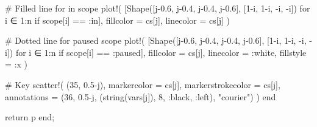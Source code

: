 \documentclass[
  letterpaper,
  DIV=11,
  numbers=noendperiod]{scrreprt}
\newenvironment{Shaded}{\begin{snugshade}}{\end{snugshade}}
\newcommand{\CommentTok}[1]{\textcolor[rgb]{0.37,0.37,0.37}{#1}}
\newcommand{\ControlFlowTok}[1]{\textcolor[rgb]{0.00,0.23,0.31}{#1}}
\newcommand{\FloatTok}[1]{\textcolor[rgb]{0.68,0.00,0.00}{#1}}
\newcommand{\FunctionTok}[1]{\textcolor[rgb]{0.28,0.35,0.67}{#1}}
\newcommand{\KeywordTok}[1]{\textcolor[rgb]{0.00,0.23,0.31}{#1}}
\newcommand{\NormalTok}[1]{\textcolor[rgb]{0.00,0.23,0.31}{#1}}
\newcommand{\OperatorTok}[1]{\textcolor[rgb]{0.37,0.37,0.37}{#1}}
\newcommand{\StringTok}[1]{\textcolor[rgb]{0.13,0.47,0.30}{#1}}
\begin{document}
\begin{Shaded}
\begin{Highlighting}[]
        \CommentTok{\# Filled line for in scope}
        \FunctionTok{plot!}\NormalTok{(}
\NormalTok{            [}\FunctionTok{Shape}\NormalTok{([j}\OperatorTok{{-}}\FloatTok{0.6}\NormalTok{, j}\OperatorTok{{-}}\FloatTok{0.4}\NormalTok{, j}\OperatorTok{{-}}\FloatTok{0.4}\NormalTok{, j}\OperatorTok{{-}}\FloatTok{0.6}\NormalTok{], [}\FloatTok{1}\OperatorTok{{-}}\NormalTok{i, }\FloatTok{1}\OperatorTok{{-}}\NormalTok{i, }\OperatorTok{{-}}\NormalTok{i, }\OperatorTok{{-}}\NormalTok{i])}
\NormalTok{                for i }\OperatorTok{∈} \FloatTok{1}\OperatorTok{:}\NormalTok{n if scope[i] }\OperatorTok{==} \OperatorTok{:}\KeywordTok{in}\NormalTok{],}
\NormalTok{            fillcolor }\OperatorTok{=}\NormalTok{ cs[j],}
\NormalTok{            linecolor }\OperatorTok{=}\NormalTok{ cs[j]}
\NormalTok{        )}
    
        \CommentTok{\# Dotted line for paused scope}
        \FunctionTok{plot!}\NormalTok{(}
\NormalTok{            [}\FunctionTok{Shape}\NormalTok{([j}\OperatorTok{{-}}\FloatTok{0.6}\NormalTok{, j}\OperatorTok{{-}}\FloatTok{0.4}\NormalTok{, j}\OperatorTok{{-}}\FloatTok{0.4}\NormalTok{, j}\OperatorTok{{-}}\FloatTok{0.6}\NormalTok{], [}\FloatTok{1}\OperatorTok{{-}}\NormalTok{i, }\FloatTok{1}\OperatorTok{{-}}\NormalTok{i, }\OperatorTok{{-}}\NormalTok{i, }\OperatorTok{{-}}\NormalTok{i])}
\NormalTok{                for i }\OperatorTok{∈} \FloatTok{1}\OperatorTok{:}\NormalTok{n if scope[i] }\OperatorTok{==} \OperatorTok{:}\NormalTok{paused],}
\NormalTok{            fillcolor }\OperatorTok{=}\NormalTok{ cs[j],}
\NormalTok{            linecolor }\OperatorTok{=} \OperatorTok{:}\NormalTok{white,}
\NormalTok{            fillstyle }\OperatorTok{=} \OperatorTok{:}\NormalTok{x}
\NormalTok{        )}

        \CommentTok{\# Key}
        \FunctionTok{scatter!}\NormalTok{(}
\NormalTok{            (}\FloatTok{35}\NormalTok{, }\FloatTok{0.5}\OperatorTok{{-}}\NormalTok{j),}
\NormalTok{            markercolor }\OperatorTok{=}\NormalTok{ cs[j],}
\NormalTok{            markerstrokecolor }\OperatorTok{=}\NormalTok{ cs[j],}
\NormalTok{            annotations }\OperatorTok{=}\NormalTok{ (}\FloatTok{36}\NormalTok{, }\FloatTok{0.5}\OperatorTok{{-}}\NormalTok{j, (}\FunctionTok{string}\NormalTok{(vars[j]), }\FloatTok{8}\NormalTok{, }\OperatorTok{:}\NormalTok{black, }\OperatorTok{:}\NormalTok{left), }\StringTok{"courier"}\NormalTok{)}
\NormalTok{        )}
    \ControlFlowTok{end}

    \ControlFlowTok{return}\NormalTok{ p}
\KeywordTok{end}\NormalTok{;}
\end{Highlighting}
\end{Shaded}
\end{document}
